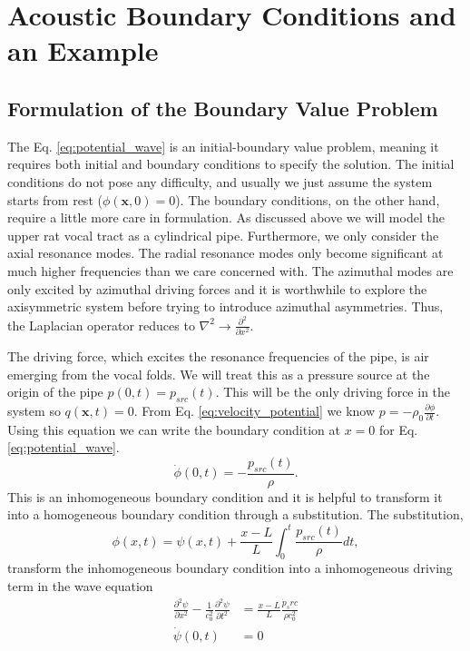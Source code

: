 \documentclass[12pt, letter]{report}
\begin{document}
\section{Acoustic Boundary Conditions and an Example}
\subsection{Formulation of the Boundary Value Problem}
The Eq. \ref{eq:potential_wave} is an initial-boundary value problem, meaning it requires both initial and boundary conditions to specify the solution. The initial conditions do not pose any difficulty, and usually we just assume the system starts from rest ($\phi(\textbf{x},0)=0$). The boundary conditions, on the other hand, require a little more care in formulation. As discussed above we will model the upper rat vocal tract as a cylindrical pipe. Furthermore, we only consider the axial resonance modes. The radial resonance modes only become significant at much higher frequencies than we care concerned with. The azimuthal modes are only excited by azimuthal driving forces and it is worthwhile to explore the axisymmetric system before trying to introduce azimuthal asymmetries. Thus, the Laplacian operator reduces to $\nabla^2 \rightarrow \frac{\partial^2 }{\partial x^2}$. 

The driving force, which excites the resonance frequencies of the pipe, is air emerging from the vocal folds. We will treat this as a pressure source at the origin of the pipe $p(0,t)=p_{src}(t)$. This will be the only driving force in the system so $q(\textbf{x}, t)=0$. From Eq. \ref{eq:velocity_potential} we know $p= -\rho_0 \frac{\partial \phi}{\partial t}$. Using this equation we can write the boundary condition at $x=0$ for Eq. \ref{eq:potential_wave}.
\begin{equation}
\dot{\phi}(0,t) = - \frac{p_{src}(t)}{\rho}.
\end{equation}
This is an inhomogeneous boundary condition and it is helpful to transform it into a homogeneous boundary condition through a substitution. The substitution,
\begin{equation}   
\phi(x,t) = \psi(x,t) + \frac{x-L}{L}\int_0^t \frac{p_{src}(t)}{\rho}dt,
\end{equation}
transform the inhomogeneous boundary condition into a inhomogeneous driving term in the wave equation
\begin{equation}
\label{eq:one_boundary}
\begin{split}
\frac{\partial^2 \psi}{\partial x^2} - \frac{1}{c_0^2}\frac{\partial^2 \psi}{\partial t^2} &= \frac{x-L}{L}\frac{\dot{p}_src}{\rho c_0^2} \\
\dot{\psi}(0,t) &= 0
\end{split}
\end{equation}
\end{document}
